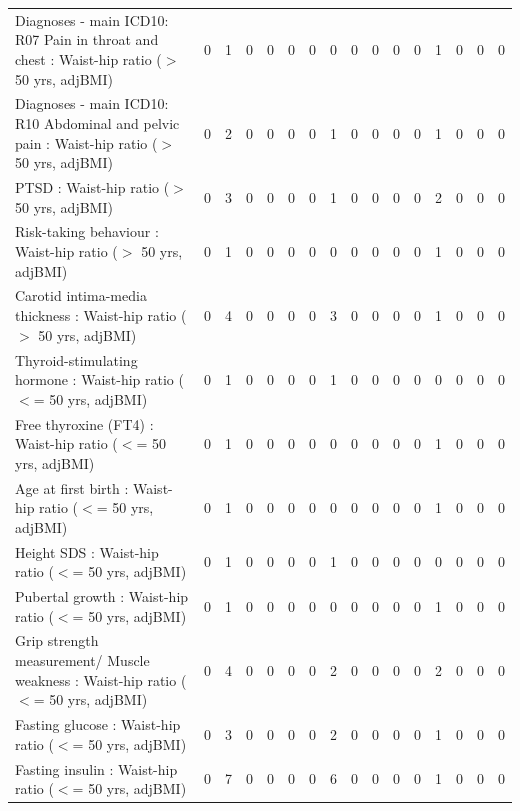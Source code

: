 \begin{table}[ht]
\begin{tabular}{lrrrrrrrrrrrrrrr}
  Diagnoses - main ICD10: R07 Pain in throat and chest : Waist-hip ratio ($>$ 50 yrs, adjBMI) &   0 &   1 &   0 &   0 &   0 &   0 &   0 &   0 &   0 &   0 &   0 &   1 &   0 &   0 &   0 \\ 
  Diagnoses - main ICD10: R10 Abdominal and pelvic pain : Waist-hip ratio ($>$ 50 yrs, adjBMI) &   0 &   2 &   0 &   0 &   0 &   0 &   1 &   0 &   0 &   0 &   0 &   1 &   0 &   0 &   0 \\ 
  PTSD : Waist-hip ratio ($>$ 50 yrs, adjBMI) &   0 &   3 &   0 &   0 &   0 &   0 &   1 &   0 &   0 &   0 &   0 &   2 &   0 &   0 &   0 \\ 
  Risk-taking behaviour : Waist-hip ratio ($>$ 50 yrs, adjBMI) &   0 &   1 &   0 &   0 &   0 &   0 &   0 &   0 &   0 &   0 &   0 &   1 &   0 &   0 &   0 \\ 
  Carotid intima-media thickness : Waist-hip ratio ($>$ 50 yrs, adjBMI) &   0 &   4 &   0 &   0 &   0 &   0 &   3 &   0 &   0 &   0 &   0 &   1 &   0 &   0 &   0 \\ 
  Thyroid-stimulating hormone  : Waist-hip ratio ($<$= 50 yrs, adjBMI) &   0 &   1 &   0 &   0 &   0 &   0 &   1 &   0 &   0 &   0 &   0 &   0 &   0 &   0 &   0 \\ 
  Free thyroxine (FT4) : Waist-hip ratio ($<$= 50 yrs, adjBMI) &   0 &   1 &   0 &   0 &   0 &   0 &   0 &   0 &   0 &   0 &   0 &   1 &   0 &   0 &   0 \\ 
  Age at first birth  : Waist-hip ratio ($<$= 50 yrs, adjBMI) &   0 &   1 &   0 &   0 &   0 &   0 &   0 &   0 &   0 &   0 &   0 &   1 &   0 &   0 &   0 \\ 
  Height SDS : Waist-hip ratio ($<$= 50 yrs, adjBMI) &   0 &   1 &   0 &   0 &   0 &   0 &   1 &   0 &   0 &   0 &   0 &   0 &   0 &   0 &   0 \\ 
  Pubertal growth  : Waist-hip ratio ($<$= 50 yrs, adjBMI) &   0 &   1 &   0 &   0 &   0 &   0 &   0 &   0 &   0 &   0 &   0 &   1 &   0 &   0 &   0 \\ 
  Grip strength measurement/ Muscle weakness : Waist-hip ratio ($<$= 50 yrs, adjBMI) &   0 &   4 &   0 &   0 &   0 &   0 &   2 &   0 &   0 &   0 &   0 &   2 &   0 &   0 &   0 \\ 
  Fasting glucose : Waist-hip ratio ($<$= 50 yrs, adjBMI) &   0 &   3 &   0 &   0 &   0 &   0 &   2 &   0 &   0 &   0 &   0 &   1 &   0 &   0 &   0 \\ 
  Fasting insulin : Waist-hip ratio ($<$= 50 yrs, adjBMI) &   0 &   7 &   0 &   0 &   0 &   0 &   6 &   0 &   0 &   0 &   0 &   1 &   0 &   0 &   0 \\ 

\end{tabular}
\end{table}
